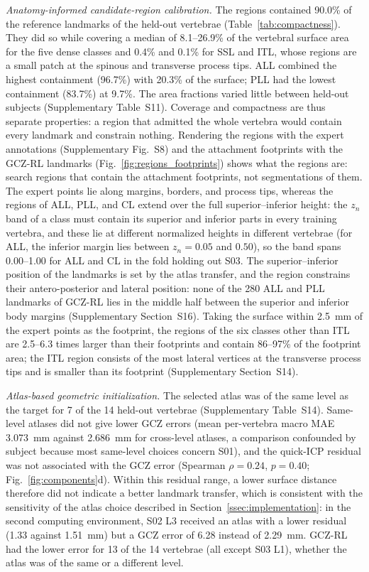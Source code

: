 \documentclass[5p,times,twocolumn,authoryear]{elsarticle}
\begin{document}
\emph{Anatomy-informed candidate-region calibration.} The regions contained 90.0\% of the reference landmarks of the held-out vertebrae (Table~\ref{tab:compactness}). They did so while covering a median of 8.1--26.9\% of the vertebral surface area for the five dense classes and 0.4\% and 0.1\% for SSL and ITL, whose regions are a small patch at the spinous and transverse process tips. ALL combined the highest containment (96.7\%) with 20.3\% of the surface; PLL had the lowest containment (83.7\%) at 9.7\%. The area fractions varied little between held-out subjects (Supplementary Table~S11). Coverage and compactness are thus separate properties: a region that admitted the whole vertebra would contain every landmark and constrain nothing. Rendering the regions with the expert annotations (Supplementary Fig.~S8) and the attachment footprints with the GCZ-RL landmarks (Fig.~\ref{fig:regions_footprints}) shows what the regions are: search regions that contain the attachment footprints, not segmentations of them. The expert points lie along margins, borders, and process tips, whereas the regions of ALL, PLL, and CL extend over the full superior--inferior height: the $z_n$ band of a class must contain its superior and inferior parts in every training vertebra, and these lie at different normalized heights in different vertebrae (for ALL, the inferior margin lies between $z_n=0.05$ and $0.50$), so the band spans 0.00--1.00 for ALL and CL in the fold holding out S03. The superior--inferior position of the landmarks is set by the atlas transfer, and the region constrains their antero-posterior and lateral position: none of the 280 ALL and PLL landmarks of GCZ-RL lies in the middle half between the superior and inferior body margins (Supplementary Section~S16). Taking the surface within 2.5~mm of the expert points as the footprint, the regions of the six classes other than ITL are 2.5--6.3 times larger than their footprints and contain 86--97\% of the footprint area; the ITL region consists of the most lateral vertices at the transverse process tips and is smaller than its footprint (Supplementary Section~S14).

\emph{Atlas-based geometric initialization.} The selected atlas was of the same level as the target for 7 of the 14 held-out vertebrae (Supplementary Table~S14). Same-level atlases did not give lower GCZ errors (mean per-vertebra macro MAE 3.073~mm against 2.686~mm for cross-level atlases, a comparison confounded by subject because most same-level choices concern S01), and the quick-ICP residual was not associated with the GCZ error (Spearman $\rho=0.24$, $p=0.40$; Fig.~\ref{fig:components}d). Within this residual range, a lower surface distance therefore did not indicate a better landmark transfer, which is consistent with the sensitivity of the atlas choice described in Section~\ref{ssec:implementation}: in the second computing environment, S02 L3 received an atlas with a lower residual (1.33 against 1.51~mm) but a GCZ error of 6.28 instead of 2.29~mm. GCZ-RL had the lower error for 13 of the 14 vertebrae (all except S03 L1), whether the atlas was of the same or a different level.
\end{document}
